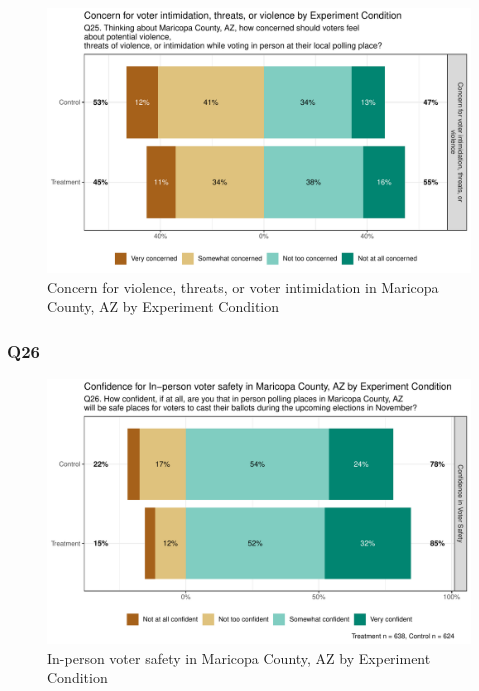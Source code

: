 \documentclass[
  11pt,
  a4paper,
]{article}
\begin{document}
\begin{figure}[H]

{\centering \includegraphics{index_files/figure-pdf/unnamed-chunk-5-1.pdf}

}

\caption{Concern for violence, threats, or voter intimidation in
Maricopa County, AZ by Experiment Condition}

\end{figure}%

\subsubsection{Q26}\label{q26}

\begin{figure}[H]

{\centering \includegraphics{index_files/figure-pdf/unnamed-chunk-6-1.pdf}

}

\caption{In-person voter safety in Maricopa County, AZ by Experiment
Condition}

\end{figure}%
\end{document}
